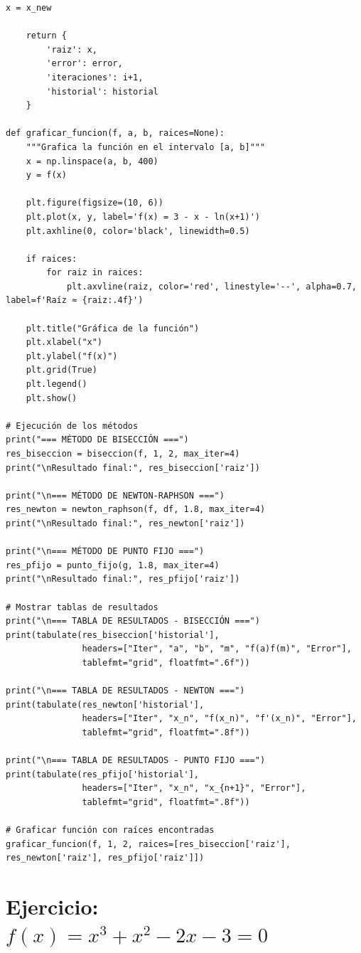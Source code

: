 \documentclass[12pt]{article}
\begin{document}
\begin{center}
\begin{tcolorbox}[title=Codigo python,
                  colback=white,
                  colframe=black,
                  breakable, enhanced]
\begin{lstlisting}[style=mypython]
        x = x_new
    
    return {
        'raiz': x,
        'error': error,
        'iteraciones': i+1,
        'historial': historial
    }

def graficar_funcion(f, a, b, raices=None):
    """Grafica la función en el intervalo [a, b]"""
    x = np.linspace(a, b, 400)
    y = f(x)
    
    plt.figure(figsize=(10, 6))
    plt.plot(x, y, label='f(x) = 3 - x - ln(x+1)')
    plt.axhline(0, color='black', linewidth=0.5)
    
    if raices:
        for raiz in raices:
            plt.axvline(raiz, color='red', linestyle='--', alpha=0.7, label=f'Raíz ≈ {raiz:.4f}')
    
    plt.title("Gráfica de la función")
    plt.xlabel("x")
    plt.ylabel("f(x)")
    plt.grid(True)
    plt.legend()
    plt.show()

# Ejecución de los métodos
print("=== MÉTODO DE BISECCIÓN ===")
res_biseccion = biseccion(f, 1, 2, max_iter=4)
print("\nResultado final:", res_biseccion['raiz'])

print("\n=== MÉTODO DE NEWTON-RAPHSON ===")
res_newton = newton_raphson(f, df, 1.8, max_iter=4)
print("\nResultado final:", res_newton['raiz'])

print("\n=== MÉTODO DE PUNTO FIJO ===")
res_pfijo = punto_fijo(g, 1.8, max_iter=4)
print("\nResultado final:", res_pfijo['raiz'])

# Mostrar tablas de resultados
print("\n=== TABLA DE RESULTADOS - BISECCIÓN ===")
print(tabulate(res_biseccion['historial'], 
               headers=["Iter", "a", "b", "m", "f(a)f(m)", "Error"], 
               tablefmt="grid", floatfmt=".6f"))

print("\n=== TABLA DE RESULTADOS - NEWTON ===")
print(tabulate(res_newton['historial'], 
               headers=["Iter", "x_n", "f(x_n)", "f'(x_n)", "Error"], 
               tablefmt="grid", floatfmt=".8f"))

print("\n=== TABLA DE RESULTADOS - PUNTO FIJO ===")
print(tabulate(res_pfijo['historial'], 
               headers=["Iter", "x_n", "x_{n+1}", "Error"], 
               tablefmt="grid", floatfmt=".8f"))

# Graficar función con raíces encontradas
graficar_funcion(f, 1, 2, raices=[res_biseccion['raiz'], res_newton['raiz'], res_pfijo['raiz']])
\end{lstlisting}
\end{tcolorbox}

\section*{Ejercicio: \(f(x) = x^3 + x^2 - 2x - 3 = 0\)}


\end{center}
\end{document}
